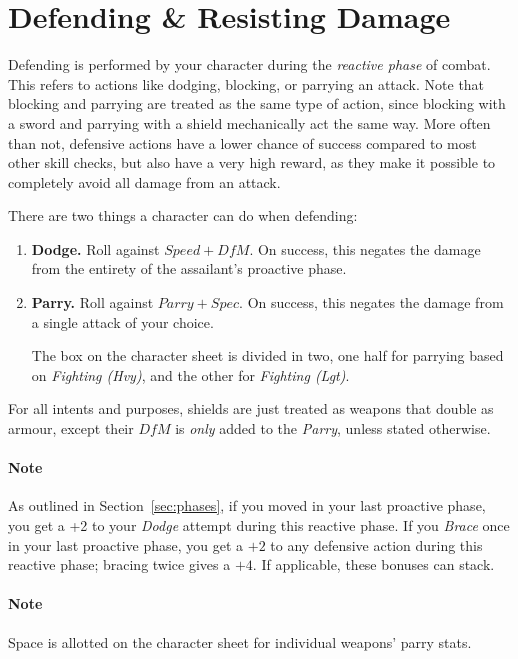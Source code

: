 \section{Defending \& Resisting Damage}\label{sec:defence}
Defending is performed by your character during the \textit{reactive phase} of combat.
This refers to actions like dodging, blocking, or parrying an attack.
Note that blocking and parrying are treated as the same type of action, since blocking with a sword and parrying with a shield mechanically act the same way.
More often than not, defensive actions have a lower chance of success compared to most other skill checks, but also have a very high reward, as they make it possible to completely avoid all damage from an attack.

There are two things a character can do when defending:
\begin{enumerate}
    \item \textbf{Dodge.} 
        Roll against $\mathit{Speed} + \mathit{DfM}$.
        On success, this negates the damage from the entirety of the assailant's proactive phase.
    \item \textbf{Parry.} 
        Roll against $Parry + Spec.$
        On success, this negates the damage from a single attack of your choice.

        The box on the character sheet is divided in two, one half for parrying based on \textit{Fighting (Hvy)}, and the other for \textit{Fighting (Lgt)}.
\end{enumerate}
For all intents and purposes, shields are just treated as weapons that double as armour, except their $\mathit{DfM}$ is \textit{only} added to the \textit{Parry}, unless stated otherwise.

\paragraph{Note} As outlined in Section~\ref{sec:phases}, if you moved in your last proactive phase, you get a +2 to your \textit{Dodge} attempt during this reactive phase. 
If you \textit{Brace} once in your last proactive phase, you get a $+2$ to any defensive action during this reactive phase; bracing twice gives a $+4$. 
If applicable, these bonuses can stack.

\paragraph{Note} Space is allotted on the character sheet for individual weapons' parry stats.

